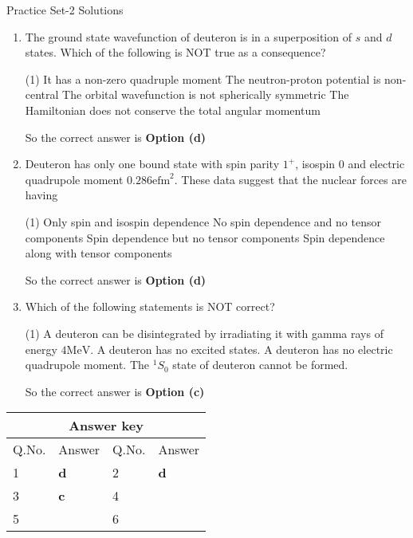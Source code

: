 \newpage
\begin{abox}
	Practice Set-2 Solutions
\end{abox}
\begin{enumerate}
	\item The ground state wavefunction of deuteron is in a superposition of $s$ and $d$ states. Which of the following is NOT true as a consequence?
	{}
	\begin{tasks}(1)
		\task[\textbf{A.}] It has a non-zero quadruple moment 
		\task[\textbf{B.}]The neutron-proton potential is non-central
		\task[\textbf{C.}] The orbital wavefunction is not spherically symmetric
		\task[\textbf{D.}]The Hamiltonian does not conserve the total angular momentum
	\end{tasks}
	\begin{answer}
		So the correct answer is \textbf{Option (d)}
	\end{answer}
	\item Deuteron has only one bound state with spin parity $1^{+}$, isospin 0 and electric quadrupole moment $0.286 \mathrm{efm}^{2}$. These data suggest that the nuclear forces are having
	{}
	\begin{tasks}(1)
		\task[\textbf{A.}] Only spin and isospin dependence
		\task[\textbf{B.}] No spin dependence and no tensor components
		\task[\textbf{C.}]Spin dependence but no tensor components
		\task[\textbf{D.}]Spin dependence along with tensor components
	\end{tasks}
	\begin{answer}
		So the correct answer is \textbf{Option (d)}
	\end{answer}
	\item Which of the following statements is NOT correct?
	{}
	\begin{tasks}(1)
		\task[\textbf{A.}] A deuteron can be disintegrated by irradiating it with gamma rays of energy $4 \mathrm{MeV}$.
		\task[\textbf{B.}] A deuteron has no excited states.
		\task[\textbf{C.}] A deuteron has no electric quadrupole moment.
		\task[\textbf{D.}] The ${ }^{1} S_{0}$ state of deuteron cannot be formed.
	\end{tasks}	
	\begin{answer}
		So the correct answer is \textbf{Option (c)}
	\end{answer}
\end{enumerate}
\setlength\arrayrulewidth{1pt}
\begin{table}[H]
	\centering
	\begin{tabular}{|p{1.5cm}|p{1.5cm}||p{1.5cm}|p{1.5cm}|}
		\hline
		\multicolumn{4}{|c|}{\textbf{Answer key}}\\\hline\hline
		\rowcolor{ocrel}Q.No.&Answer&Q.No.&Answer\\\hline
		1&\textbf{d} &2&\textbf{d}\\\hline 
		3&\textbf{c} &4&\textbf{} \\\hline
		5&\textbf{} &6&\textbf{} \\\hline
		
	\end{tabular}
\end{table}